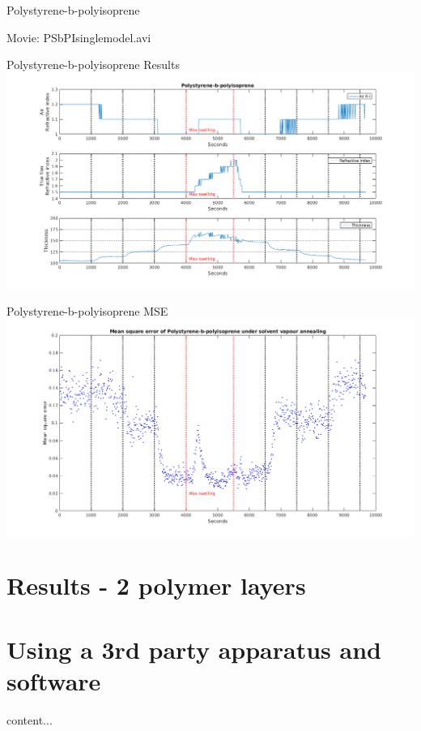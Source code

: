 \documentclass[10pt]{beamer}
\begin{document}
\begin{frame}{Polystyrene-b-polyisoprene}
\begin{center}
\huge Movie: PSbPIsinglemodel.avi
\end{center}
\end{frame}

\begin{frame}{Polystyrene-b-polyisoprene Results}
\includegraphics[width=\textwidth]{PSbPIsinglemodel1.png}
\end{frame}

\begin{frame}{Polystyrene-b-polyisoprene MSE}
\includegraphics[width=\textwidth]{PSbPIsinglemodel2.png}
\end{frame}

	\section{Results - 2 polymer layers}
	
	\section{Using a 3rd party apparatus and software}
\begin{frame}{}
content...
\end{frame}
\end{document}
